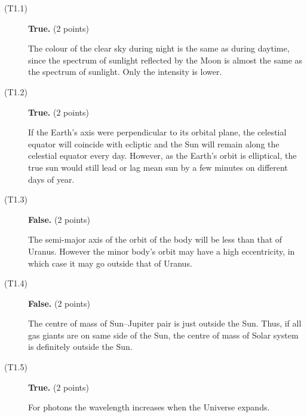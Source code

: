 \begin{description}
\item[(T1.1)] \textbf{True.} \hfill(2 points)

  The colour of the clear sky during night is the same as during daytime,
  since the spectrum of sunlight reflected by the Moon is almost the same as
  the spectrum of sunlight. Only the intensity is lower.

\item[(T1.2)] \textbf{True.} \hfill(2 points)

  If the Earth's axis were perpendicular to its orbital plane, the celestial
  equator will coincide with ecliptic and the Sun will remain along the
  celestial equator every day. However, as the Earth's orbit is elliptical,
  the true sun would still lead or lag mean sun by a few minutes on different
  days of year.

\item[(T1.3)] \textbf{False.} \hfill(2 points)

  The semi-major axis of the orbit of the body will be less than that of
  Uranus. However the minor body's orbit may have a high eccentricity, in
  which case it may go outside that of Uranus.

\item[(T1.4)] \textbf{False.} \hfill(2 points)

  The centre of mass of Sun--Jupiter pair is just outside the Sun. Thus, if
  all gas giants are on same side of the Sun, the centre of mass of Solar
  system is definitely outside the Sun.

\item[(T1.5)] \textbf{True.} \hfill(2 points)

  For photons the wavelength increases when the Universe expands.
\end{description}
